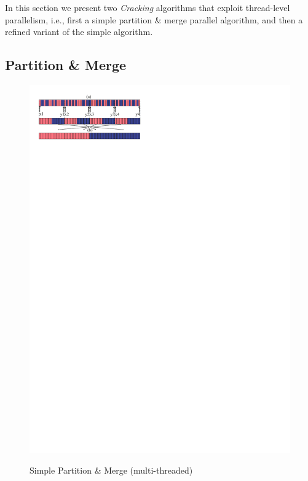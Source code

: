 In this section we present two \emph{Cracking} algorithms that exploit thread-level parallelism, i.e.,
first a simple partition \& merge parallel algorithm, and 
then a refined variant of the simple algorithm.

\subsection*{Partition \& Merge}
\label{subsubsec:partition-merge}

\begin{figure}[!t]
\begin{center}
\includegraphics[trim=0.6cm 25.5cm 0cm 1cm]{Figures/damon/mcrack1}
\caption{Simple Partition \& Merge (multi-threaded)}
\vspace{-2.5ex}
\label{fig:mcrack1}
\end{center}
\end{figure}

